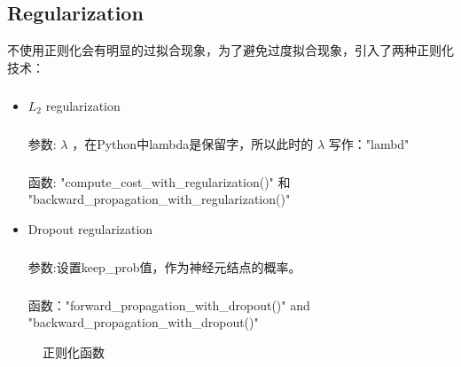 \documentclass{article}
\begin{document}
\begin{CJK}{UTF8}{gbsn}
\subsection{Regularization}
不使用正则化会有明显的过拟合现象，为了避免过度拟合现象，引入了两种正则化技术：
\subparagraph{}
\begin{itemize}
\item $L_2$ regularization
\subparagraph{}
参数: $\lambda$ ，在Python中lambda是保留字，所以此时的 $\lambda$ 写作："lambd"
\subparagraph{}
函数: "compute\_{}cost\_{}with\_{}regularization()" 和 "backward\_{}propagation\_{}with\_{}regularization()"
\item Dropout regularization 
\subparagraph{}
参数:设置keep\_{}prob值，作为神经元结点的概率。
\subparagraph{}
函数："forward\_{}propagation\_{}with\_{}dropout()" and "backward\_{}propagation\_{}with\_{}dropout()"
\end{itemize}
\begin{figure}[H]
\label{fig:20}
\caption{正则化函数}
\end{figure}

\end{CJK}
\end{document}
